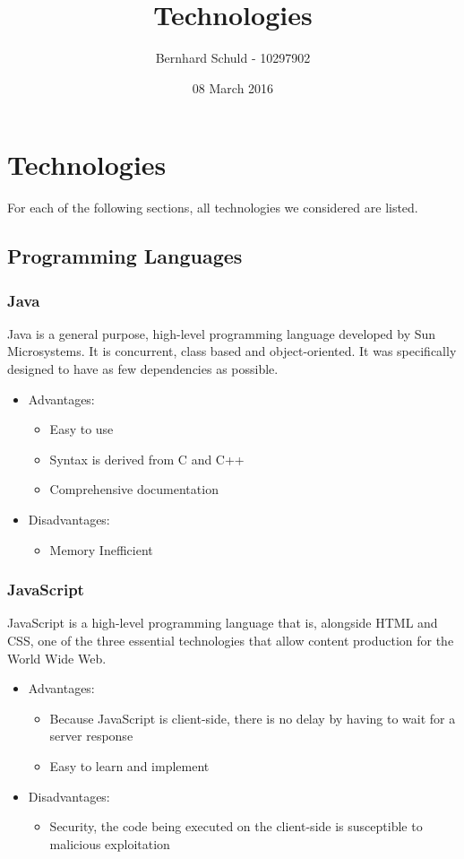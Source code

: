 \documentclass[12pt, letterpaper, twoside]{article}
\title{Technologies}
\author{Bernhard Schuld - 10297902}
\date{08 March 2016}
\begin{document}
\section{Technologies}

	For each of the following sections, all technologies we considered are listed.
	
	\subsection{Programming Languages}
			\subsubsection{Java}
				Java is a general purpose, high-level programming language developed by Sun Microsystems. It is concurrent, class based and object-oriented. It was specifically designed to have as few dependencies as possible.
				
				\begin{itemize}			
					\item Advantages:
						\begin{itemize}
							\item Easy to use
							\item Syntax is derived from C and C++
							\item Comprehensive documentation
						\end{itemize}
						
					\item Disadvantages:
						\begin{itemize}
							\item Memory Inefficient
						\end{itemize}
				\end{itemize}
				
			\subsubsection{JavaScript}
				JavaScript is a high-level programming language that is, alongside HTML and CSS, one of the three essential technologies that allow content production for the World Wide Web.
				
				\begin{itemize}
					\item Advantages:
						\begin{itemize}
							\item  Because JavaScript is client-side, there is no delay by having to wait for a server response
							\item Easy to learn and implement
						\end{itemize}
						
					\item Disadvantages:
						\begin{itemize}
							\item Security, the code being executed on the client-side is susceptible to malicious exploitation
						\end{itemize}
				\end{itemize}
				
\end{document}
